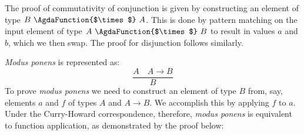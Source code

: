 \documentclass[12pt,a4paper,twoside,openright]{report}
\newcommand{\F}{\AgdaFunction}
\begin{document}
\begin{code}
\> \AgdaSymbol{:} \AgdaSymbol{\{}  \AgdaSymbol{:} \AgdaSymbol{\}}        \<%
\\
\> \AgdaSymbol{(} \AgdaInductiveConstructor{,} \AgdaSymbol{)} \AgdaSymbol{=} \AgdaSymbol{(} \AgdaInductiveConstructor{,} \AgdaSymbol{)}\<%
\\
%
\\
\> \AgdaSymbol{:} \AgdaSymbol{\{}  \AgdaSymbol{:} \AgdaSymbol{\}}        \<%
\\
\> \AgdaSymbol{(} \AgdaSymbol{)} \AgdaSymbol{=}  \<%
\\
\> \AgdaSymbol{(} \AgdaSymbol{)} \AgdaSymbol{=}  \<%
\end{code}

The proof of commutativity of conjunction is given by constructing an element of type $B\ \F{$\times$}\ A$. This is done by pattern matching on the input element of type $A\ \F{$\times$}\ B$ to result in values $a$ and $b$, which we then swap. The proof for disjunction follows similarly.

% 

{\it Modus ponens} is represented as:
$$\dfrac{A \quad  A \to B}{B}$$
To prove {\it modus ponens} we need to construct an element of type $B$ from, say, elements $a$ and $f$ of types $A$ and $A \to B$. We accomplish this by applying $f$ to $a$.
Under the Curry-Howard correspondence, therefore, {\it modus ponens} is equivalent to function application, as demonstrated by the proof below:
\end{document}
